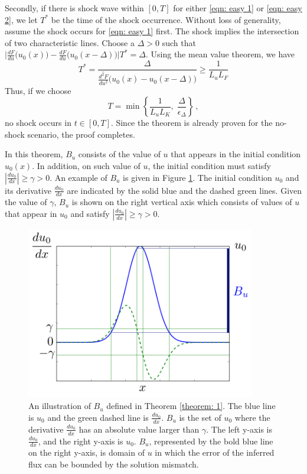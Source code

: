 Secondly, if there is shock wave within $[0,T]$ for either \eqref{eqn: easy 1} or \eqref{eqn: easy 2}, we let
$T^*$ be the time of the shock occurrence. Without loss of generality, assume the shock occurs for \eqref{eqn: easy 1} first.
The shock implies the intersection of two characteristic lines. Choose a $\Delta>0$
such that $\big| \frac{dF}{du}\big(u_0(x)\big) - \frac{dF}{du} \big( u_0(x-\Delta) \big) \big|T^* = \Delta$.
Using the mean value theorem, we have
$$
    T^* = \frac{\Delta}{ \overline{\frac{d^2 F}{du^2}} \big( u_0(x) - u_0(x-\Delta) \big) } \ge \frac{1}{L_u L_F}
$$
Thus, if we choose
$$
    T = \min \left\{ 
        \frac{1}{L_uL_K},\;\frac{\Delta}{\epsilon_\Delta}
    \right\}\,,
$$
no shock occurs in $t\in[0,T]$. Since the theorem is already proven for the no-shock scenario, the proof completes.\hfill \qedsymbol


In this theorem, $B_u$ consists of the value of $u$ that 
appears in the initial condition $u_0(x)$. In addition, on such value of $u$, the 
initial condition must satisfy $\left|\frac{du_0}{dx}\right|\ge \gamma > 0$.
An example of $B_u$ is given in Figure \ref{fig: excitedDomain}.
The initial condition $u_0$ and its derivative $\frac{du_0}{dx}$ are indicated by the
solid blue and the dashed green lines. Given the value of $\gamma$, 
$B_u$ is shown on the right vertical axis which consists of values of $u$ that appear in $u_0$
and satisfy $\left|\frac{du_0}{dx}\right|\ge \gamma > 0$.\\

\begin{figure}[htbp]
    \begin{center}
        \includegraphics[width=10cm]{../excitedDomain.png}
        \caption{An illustration of $B_u$ defined in Theorem \ref{theorem: 1}. The blue line is $u_0$ 
        and the green dashed line is $\frac{du_0}{dx}$. $B_u$ is the set of $u_0$ where the derivative 
        $\frac{du_0}{dx}$ has an absolute value larger than $\gamma$.
        The left y-axis is $\frac{du_0}{dx}$, and the right y-axis is $u_0$.
        $B_u$, represented by the bold blue line on the right y-axis,
        is domain of $u$ in which the error of the inferred flux can be bounded by the solution
        mismatch.}
        \label{fig: excitedDomain}
    \end{center}
\end{figure}

